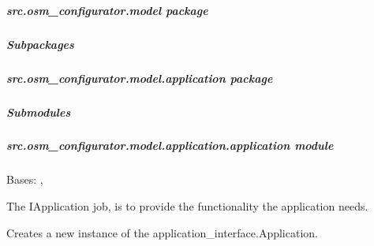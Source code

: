 \documentclass[letterpaper,10pt,english]{sphinxmanual}
\begin{document}
\subparagraph{src.osm\_configurator.model package}
\label{\detokenize{apidoc/src.osm_configurator.model:src-osm-configurator-model-package}}\label{\detokenize{apidoc/src.osm_configurator.model::doc}}

\subparagraph{Subpackages}
\label{\detokenize{apidoc/src.osm_configurator.model:subpackages}}
\sphinxstepscope


\subparagraph{src.osm\_configurator.model.application package}
\label{\detokenize{apidoc/src.osm_configurator.model.application:src-osm-configurator-model-application-package}}\label{\detokenize{apidoc/src.osm_configurator.model.application::doc}}

\subparagraph{Submodules}
\label{\detokenize{apidoc/src.osm_configurator.model.application:submodules}}

\subparagraph{src.osm\_configurator.model.application.application module}
\label{\detokenize{apidoc/src.osm_configurator.model.application:module-src.osm_configurator.model.application.application}}\label{\detokenize{apidoc/src.osm_configurator.model.application:src-osm-configurator-model-application-application-module}}

\begin{fulllineitems}
\label{\detokenize{apidoc/src.osm_configurator.model.application:src.osm_configurator.model.application.application.Application}}
\pysigstartsignatures
{}
\pysigstopsignatures
\sphinxAtStartPar
Bases: {\hyperref[\detokenize{apidoc/src.osm_configurator.model.application:src.osm_configurator.model.application.application_interface.IApplication}]{}}, 

\sphinxAtStartPar
The IApplication job, is to provide the functionality the application needs.

\begin{fulllineitems}
\label{\detokenize{apidoc/src.osm_configurator.model.application:src.osm_configurator.model.application.application.Application.__init__}}
\pysigstartsignatures
{}
\pysigstopsignatures
\sphinxAtStartPar
Creates a new instance of the application\_interface.Application.

\end{fulllineitems}


\end{fulllineitems}
\end{document}
